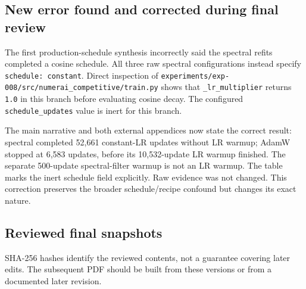 \documentclass[
  british,
  10pt,
  a4paper,
]{article}
\begin{document}
\subsection{New error found and corrected during final
review}\label{final-resolution--new-error-found-and-corrected-during-final-review}

The first production-\allowbreak{}schedule synthesis incorrectly said
the spectral refits completed a cosine schedule. All three raw spectral
configurations instead specify
\texttt{schedule:\allowbreak{} \allowbreak{}constant}. Direct inspection
of
\texttt{experiments/\allowbreak{}exp-\allowbreak{}008/\allowbreak{}src/\allowbreak{}numerai\_\allowbreak{}competitive/\allowbreak{}train.\allowbreak{}py}
shows that \texttt{\_\allowbreak{}lr\_\allowbreak{}multiplier} returns
\texttt{1.0} in this branch before evaluating cosine decay. The
configured \texttt{schedule\_\allowbreak{}updates} value is inert for
this branch.

The main narrative and both external appendices now state the correct
result: spectral completed 52,661 constant-\allowbreak{}LR updates
without LR warmup; AdamW stopped at 6,583 updates, before its
10,\allowbreak{}532-\allowbreak{}update LR warmup finished. The separate
500-update spectral-\allowbreak{}filter warmup is not an LR warmup. The
table marks the inert schedule field explicitly.\allowbreak{} Raw
evidence was not changed. This correction preserves the broader
schedule/\allowbreak{}recipe confound but changes its exact nature.

\subsection{Reviewed final
snapshots}\label{final-resolution--reviewed-final-snapshots}

SHA-256 hashes identify the reviewed contents, not a guarantee covering
later edits. The subsequent PDF should be built from these versions or
from a documented later revision.
\end{document}
